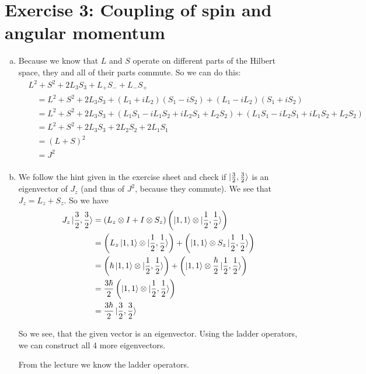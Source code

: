 \documentclass[a4paper,german,12pt,smallheadings]{scrartcl}
\begin{document}
\section*{Exercise 3: Coupling of spin and angular momentum}
\begin{enumerate}[a)]
  \item
    Because we know that $L$ and $S$ operate on different parts of the Hilbert
    space, they and all of their parts commute. So we can do this:
    \begin{align*}
      &L^2 + S^2 + 2 L_3 S_3 + L_+ S_- + L_- S_+ \\
      &\quad = L^2 + S^2 + 2 L_3 S_3 + (L_1+iL_2) (S_1-iS_2) + (L_1-iL_2)(S_1 + iS_2) \\
      &\quad = L^2 + S^2 + 2 L_3 S_3 + (L_1S_1 -iL_1S_2 +iL_2S_1 +L_2S_2) + (L_1S_1 - iL_2S_1 + iL_1S_2 + L_2S_2) \\
      &\quad = L^2 + S^2 + 2 L_3 S_3 + 2L_2S_2 + 2L_1S_1 \\
      &\quad = (L+S)^2 \\
      &\quad = J^2 \\
    \end{align*}
  \item
    We follow the hint given in the exercise sheet and check if
    $\ket{\frac{3}{2}, \frac{3}{2}}$ is an eigenvector of $J_z$ (and thus of $J^2$, because
    they commute). We see that $J_z = L_z + S_z$. So we have
    \begin{align*}
      J_z \ket{\frac{3}{2}, \frac{3}{2}} 
      &= (L_z \otimes I + I \otimes S_z) \del{\ket{1,1} \otimes \ket{\frac{1}{2}, \frac{1}{2}}} \\
      &= \del{L_z \ket{1,1} \otimes \ket{\frac{1}{2}, \frac{1}{2}}} + \del{\ket{1,1} \otimes S_z \ket{\frac{1}{2}, \frac{1}{2}}} \\
      &= \del{\hbar \ket{1,1} \otimes \ket{\frac{1}{2}, \frac{1}{2}}} + \del{\ket{1,1} \otimes \frac{\hbar}{2} \ket{\frac{1}{2}, \frac{1}{2}}} \\
      &= \frac{3\hbar}{2} \del{\ket{1,1} \otimes \ket{\frac{1}{2}, \frac{1}{2}}} \\
      &= \frac{3\hbar}{2} \ket{\frac{3}{2}, \frac{3}{2}}
    \end{align*}

    So we see, that the given vector is an eigenvector. Using the ladder
    operators, we can construct all 4 more eigenvectors.

    From the lecture we know the ladder operators.


\end{enumerate}
\end{document}
